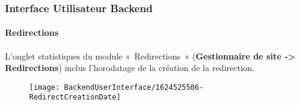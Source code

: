 %

\begin{frame}[fragile]
	\frametitle{Interface Utilisateur Backend}
	\framesubtitle{Redirections}

    L'onglet statistiques du module «~Redirections~» (\textbf{Gestionnaire de site -> Redirections})
    inclus l'horodatage de la création de la redirection.

	\begin{figure}
		\texttt{[image: BackendUserInterface/1624525506-RedirectCreationDate]}
	\end{figure}

\end{frame}

